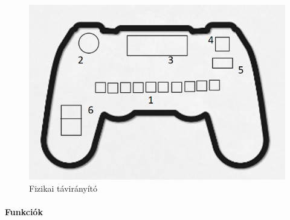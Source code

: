 \documentclass{article}
\begin{document}
\begin{figure}[H]
\centering
\includegraphics[width=1\linewidth]{fizikaitavir_feluletter.png}
\caption{\label{fig:image}Fizikai távirányító}
\end{figure}


\paragraph{Funkciók}
\end{document}
